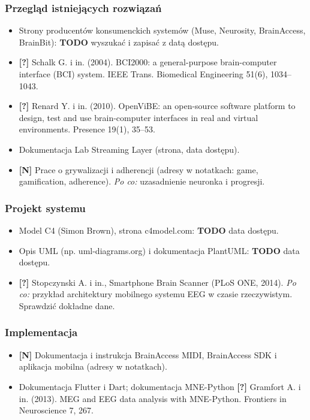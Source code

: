 \subsubsection*{Przegląd istniejących rozwiązań}

\begin{itemize}
    \item Strony producentów konsumenckich systemów (Muse, Neurosity,
          BrainAccess, BrainBit): \textbf{TODO} wyszukać i zapisać
          z datą dostępu.
    \item \textbf{[?]} Schalk G. i in. (2004). BCI2000: a general-purpose
          brain-computer interface (BCI) system.
          IEEE Trans. Biomedical Engineering 51(6), 1034--1043.
    \item \textbf{[?]} Renard Y. i in. (2010). OpenViBE: an open-source
          software platform to design, test and use brain-computer
          interfaces in real and virtual environments.
          Presence 19(1), 35--53.
    \item Dokumentacja Lab Streaming Layer (strona, data dostępu).
    \item \textbf{[N]} Prace o grywalizacji i adherencji
          (adresy w notatkach: game, gamification, adherence).
          \emph{Po co:} uzasadnienie neuronka i progresji.
\end{itemize}

\subsubsection*{Projekt systemu}

\begin{itemize}
    \item Model C4 (Simon Brown), strona c4model.com: \textbf{TODO} data dostępu.
    \item Opis UML (np. uml-diagrams.org) i dokumentacja PlantUML:
          \textbf{TODO} data dostępu.
    \item \textbf{[?]} Stopczynski A. i in., Smartphone Brain Scanner
          (PLoS ONE, 2014). \emph{Po co:} przykład architektury
          mobilnego systemu EEG w czasie rzeczywistym.
          Sprawdzić dokładne dane.
\end{itemize}

\subsubsection*{Implementacja}

\begin{itemize}
    \item \textbf{[N]} Dokumentacja i instrukcja BrainAccess MIDI,
          BrainAccess SDK i aplikacja mobilna (adresy w notatkach).
    \item Dokumentacja Flutter i Dart; dokumentacja MNE-Python
          \textbf{[?]} Gramfort A. i in. (2013). MEG and EEG data analysis
          with MNE-Python. Frontiers in Neuroscience 7, 267.
\end{itemize}

